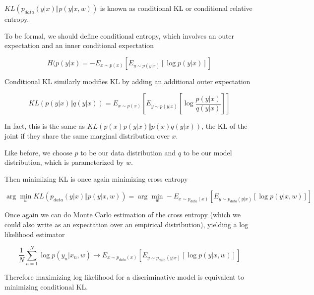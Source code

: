 \documentclass[a4paper]{article}
\begin{document}
$KL\left( p_{data}(y \vert x) \Vert p( y \vert x, w) \right)$ is known as conditional KL or conditional relative entropy.

To be formal, we should define conditional entropy, which involves an outer expectation and an inner conditional expectation

\begin{equation}
  H( p(y \vert x) = - E_{ x \sim p(x) } \left[ E_{ y \sim p(y \vert x)} \left[ \log p(y \vert x) \right] \right]
  \label{Conditional Entropy}
\end{equation}

Conditional KL similarly modifies KL by adding an additional outer expectation

\begin{equation}
  KL\left( p(y \vert x) \Vert q(y \vert x) \right) = E_{ x \sim p(x)} \left[ E_{y \sim p(y \vert x)} \left[ \log \frac{p( y \vert x)}{q(y \vert x)} \right] \right]
  \label{Conditional KL}
\end{equation}

In fact, this is the same as $ KL\left( p(x)p(y \vert x) \Vert p(x) q(y \vert x) \right) $, the KL of the joint if they share the same marginal distribution over $x$.

Like before, we choose $p$ to be our data distribution and $q$ to be our model distribution, which is parameterized by $w$. 

Then minimizing KL is once again minimizing cross entropy

\begin{equation}
  \arg \min_w KL\left( p_{data}(y \vert x) \Vert p(y \vert x, w) \right) = \arg \min_w - E_{ x \sim p_{data}(x)} \left[ E_{ y \sim p_{data}(y \vert x) } \left[ \log p( y \vert x, w) \right] \right]
  \label{}
\end{equation}

Once again we can do Monte Carlo estimation of the cross entropy (which we could also write as an expectation over an empirical distribution), yielding a log likelihood estimator

\begin{equation}
  \frac{1}{N} \sum_{n=1}^N \log p( y_n \vert x_n, w) \rightarrow E_{ x \sim p_{data}(x)} \left[ E_{ y \sim p_{data}(y \vert x) } \left[ \log p( y \vert x, w) \right] \right]
  \label{}
\end{equation}

Therefore maximizing log likelihood for a discriminative model is equivalent to minimizing conditional KL.
\end{document}
